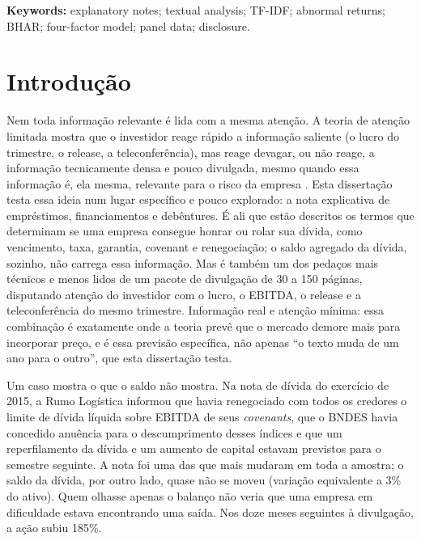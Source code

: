 \documentclass[a4paper,12pt]{report}
\begin{document}
\vspace{0.5cm}
\noindent
\textbf{Keywords:} explanatory notes; textual analysis; TF-IDF; abnormal returns; BHAR; four-factor model; panel data; disclosure.
\thispagestyle{empty}
\newpage

\tableofcontents
\thispagestyle{empty}
\newpage

\chapter{Introdução}

Nem toda informação relevante é lida com a mesma atenção. A teoria de atenção limitada mostra que o investidor reage rápido a informação saliente (o lucro do trimestre, o release, a teleconferência), mas reage devagar, ou não reage, a informação tecnicamente densa e pouco divulgada, mesmo quando essa informação é, ela mesma, relevante para o risco da empresa \cite{hirshleifer2011}. Esta dissertação testa essa ideia num lugar específico e pouco explorado: a nota explicativa de empréstimos, financiamentos e debêntures. É ali que estão descritos os termos que determinam se uma empresa consegue honrar ou rolar sua dívida, como vencimento, taxa, garantia, covenant e renegociação; o saldo agregado da dívida, sozinho, não carrega essa informação. Mas é também um dos pedaços mais técnicos e menos lidos de um pacote de divulgação de 30 a 150 páginas, disputando atenção do investidor com o lucro, o EBITDA, o release e a teleconferência do mesmo trimestre. Informação real e atenção mínima: essa combinação é exatamente onde a teoria prevê que o mercado demore mais para incorporar preço, e é essa previsão específica, não apenas ``o texto muda de um ano para o outro'', que esta dissertação testa.

Um caso mostra o que o saldo não mostra. Na nota de dívida do exercício de 2015, a Rumo Logística informou que havia renegociado com todos os credores o limite de dívida líquida sobre EBITDA de seus \textit{covenants}, que o BNDES havia concedido anuência para o descumprimento desses índices e que um reperfilamento da dívida e um aumento de capital estavam previstos para o semestre seguinte. A nota foi uma das que mais mudaram em toda a amostra; o saldo da dívida, por outro lado, quase não se moveu (variação equivalente a 3\% do ativo). Quem olhasse apenas o balanço não veria que uma empresa em dificuldade estava encontrando uma saída. Nos doze meses seguintes à divulgação, a ação subiu 185\%.
\end{document}
